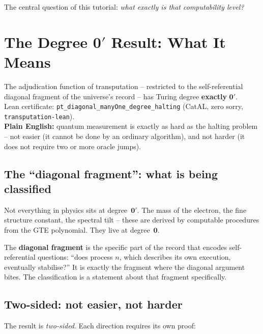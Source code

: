 \documentclass[11pt,a4paper]{article}
\newcommand{\term}[1]{\textbf{#1}}
\newcommand{\lean}[1]{\texttt{#1}}
\newcommand{\zerp}{\mathbf{0}'}
\newcommand{\zer}{\mathbf{0}}
\begin{document}
The central question of this tutorial: \emph{what exactly is that
computability level?}

\section{The Degree $\zerp$ Result: What It Means}
\label{sec:degree}

\begin{tcolorbox}[colback=boxgreen,colframe=green!50!black,
  title={The Main Result (P51~\cite{SpivackPolynomialTransputation}, Lean-certified)}]
The adjudication function of transputation -- restricted to the
self-referential diagonal fragment of the universe's record -- has Turing
degree \textbf{exactly} $\zerp$.\\[6pt]
Lean certificate: \lean{pt\_diagonal\_manyOne\_degree\_halting} (CatAL,
zero sorry, \texttt{transputation-lean}).\\[6pt]
\textbf{Plain English:} quantum measurement is exactly as hard as the
halting problem -- not easier (it cannot be done by an ordinary algorithm),
and not harder (it does not require two or more oracle jumps).
\end{tcolorbox}

\subsection{The ``diagonal fragment'': what is being classified}

Not everything in physics sits at degree~$\zerp$. The mass of the electron,
the fine structure constant, the spectral tilt -- these are derived by
computable procedures from the GTE polynomial.  They live at degree~$\zer$.

The \term{diagonal fragment} is the specific part of the record that encodes
self-referential questions: ``does process $n$, which describes its own
execution, eventually stabilise?'' It is exactly the fragment where the
diagonal argument bites. The classification is a statement about that
fragment specifically.

\subsection{Two-sided: not easier, not harder}

The result is \emph{two-sided}. Each direction requires its own proof:
\end{document}
